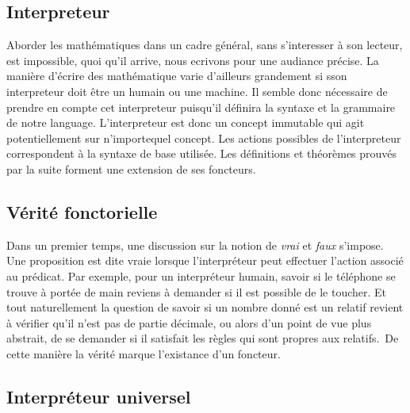 \documentclass[10pt,b5paper, french]{book}
\begin{document}
\subsection{Interpreteur}
Aborder les mathématiques dans un cadre général, sans s'interesser à son lecteur, est impossible, quoi qu'il arrive, nous ecrivons pour une audiance précise. La manière d'écrire des mathématique varie d'ailleurs grandement si sson interpreteur doit être un humain ou une machine. Il semble donc nécessaire de prendre en compte cet interpreteur puisqu'il définira la syntaxe et la grammaire de notre language.
L'interpreteur est donc un concept immutable qui agit potentiellement sur n'importequel concept. Les actions possibles de l'interpreteur correspondent à la syntaxe de base utilisée. Les définitions et théorèmes prouvés par la suite forment une extension de ses foncteurs.	 

\subsection{Vérité fonctorielle}

Dans un premier temps, une discussion sur la notion de \textit{vrai} et \textit{faux} s'impose. Une proposition est dite vraie lorsque l'interpréteur peut effectuer l'action associé au prédicat. Par exemple, pour un interpréteur humain, savoir si le téléphone se trouve à portée de main reviens à demander si il est possible de le toucher. Et tout naturellement la question de savoir si un nombre donné est un relatif revient à vérifier qu'il n'est pas de partie décimale, ou alors d'un point de vue plus abstrait, de se demander si il satisfait les règles qui sont propres aux relatifs.\
De cette manière la vérité marque l'existance d'un foncteur. 

\subsection{Interpréteur universel}

 
\printindex
\end{document}

